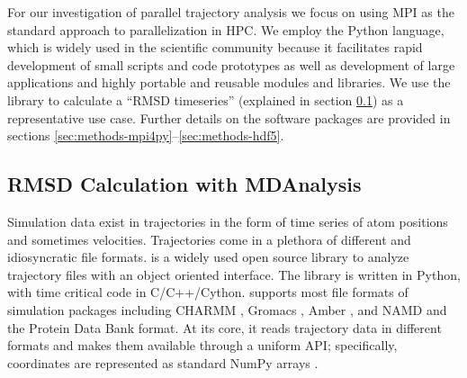 \label{sec:packages}

For our investigation of parallel trajectory analysis we focus on using MPI as the standard approach to parallelization in HPC.
We employ the Python language, which is widely used in the scientific community because it facilitates rapid development of small scripts and code prototypes as well as development of large applications and highly portable and reusable modules and libraries.
We use the  library to calculate a ``RMSD timeseries'' (explained in section \ref{sec:mda}) as a representative use case.
Further details on the software packages are provided in sections \ref{sec:methods-mpi4py}--\ref{sec:methods-hdf5}.


\subsection{RMSD Calculation with MDAnalysis}
\label{sec:mda}

Simulation data exist in trajectories in the form of time series of atom positions and sometimes velocities.
Trajectories come in a plethora of different and idiosyncratic file formats. 
 \cite{Gowers:2016aa, Michaud-Agrawal:2011fu} is a widely used open source library to analyze trajectory files with an object oriented interface. 
The library is written in Python, with time critical code in C/C++/Cython. 
 supports most file formats of simulation packages including CHARMM \cite{Brooks:2009pt}, Gromacs \cite{Abraham:2015aa}, Amber \cite{Case:2005uq}, and NAMD \cite{Phillips:2005ek} and the Protein Data Bank \cite{Burley:2018aa} format.
At its core, it reads trajectory data in different formats and makes them available through a uniform API; specifically, coordinates are represented as standard NumPy arrays \cite{Van-Der-Walt:2011aa}.


